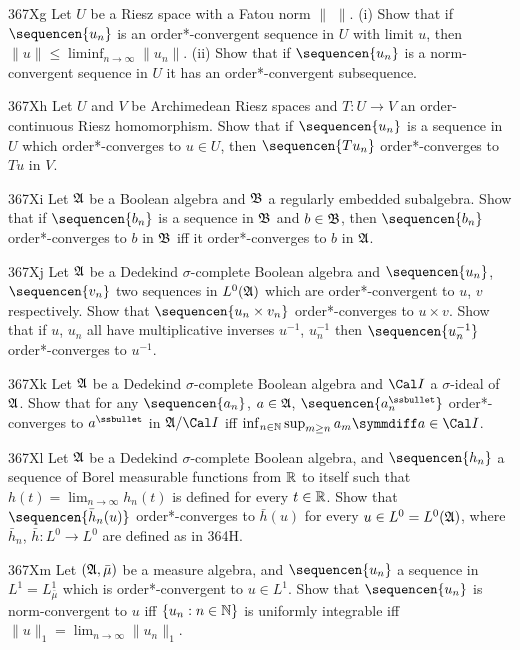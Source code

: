 {\sqheader 367Xg Let $U$ be a Riesz space with a Fatou norm $\|\,\,\|$.
(i) Show that if $\sequencen{u_n}$ is an order*-convergent sequence
in $U$ with limit $u$, then $\|u\|\le\liminf_{n\to\infty}\|u_n\|$.
(ii) Show that if $\sequencen{u_n}$ is a norm-convergent sequence in $U$
it has an order*-convergent subsequence.   
     
\spheader 367Xh Let $U$ and $V$ be Archimedean Riesz spaces and
$T:U\to V$ an order-continuous Riesz homomorphism.   Show that if
$\sequencen{u_n}$ is a sequence in $U$ which order*-converges to
$u\in U$, then $\sequencen{Tu_n}$ order*-converges to $Tu$ in $V$.
     
\spheader 367Xi Let $\frak A$ be a Boolean algebra and $\frak B$ 
a regularly embedded subalgebra.   
Show that if $\sequencen{b_n}$ is a sequence
in $\frak B$ and $b\in\frak B$, then $\sequencen{b_n}$
order*-converges to $b$ in $\frak B$ iff it order*-converges to
$b$ in $\frak A$.
     
\spheader 367Xj Let $\frak A$ be a Dedekind $\sigma$-complete Boolean
algebra and $\sequencen{u_n}$, $\sequencen{v_n}$ two sequences in
$L^0(\frak A)$ which are order*-convergent to $u$, $v$
respectively.   Show that $\sequencen{u_n\times v_n}$
order*-converges
to $u\times v$.   Show that if $u$, $u_n$ all have
multiplicative inverses $u^{-1}$, $u_n^{-1}$ then
$\sequencen{u_n^{-1}}$ order*-converges to $u^{-1}$.
     
\spheader 367Xk Let $\frak A$ be a Dedekind $\sigma$-complete Boolean
algebra and $\Cal I$ a $\sigma$-ideal of $\frak A$.   Show that for any
$\sequencen{a_n}$, $a\in\frak A$, $\sequencen{a_n^{\ssbullet}}$
order*-converges to $a^{\ssbullet}$ in $\frak A/\Cal I$ iff
$\inf_{n\in\Bbb N}\sup_{m\ge n}a_m\symmdiff a\in\Cal I$.
     
\sqheader 367Xl Let $\frak A$ be a Dedekind $\sigma$-complete Boolean
algebra, and $\sequencen{h_n}$ a sequence of Borel measurable functions
from $\Bbb R$ to itself such that $h(t)=\lim_{n\to\infty}h_n(t)$ is
defined for every $t\in\Bbb R$.   Show that $\sequencen{\bar h_n(u)}$
order*-converges to $\bar h(u)$ for every $u\in L^0=L^0(\frak A)$,
where $\bar h_n$, $\bar h:L^0\to L^0$ are defined as in 364H.
     
\spheader 367Xm Let $(\frak A,\bar\mu)$ be a measure algebra, and
$\sequencen{u_n}$ a sequence in $L^1=L^1_{\bar\mu}$ which is
order*-convergent to $u\in L^1$.   Show that
$\sequencen{u_n}$ is norm-convergent to $u$ iff $\{u_n:n\in\Bbb N\}$ is
uniformly integrable iff $\|u\|_1=\lim_{n\to\infty}\|u_n\|_1$.
     
}
